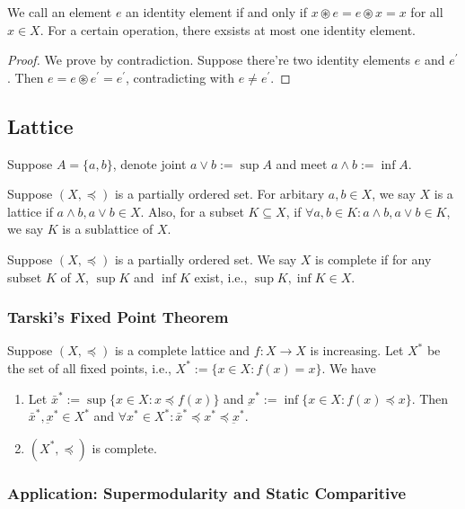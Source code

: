 \begin{proposition}
    We  call an element $e$ an identity element if and only if $x \circledast e = e \circledast x = x$ for all $x \in X$. For a certain operation, there exsists at most one identity element.    
\end{proposition}
\begin{proof}
    We prove by contradiction. Suppose there're two identity elements $e$ and $e^{\prime}$. Then $e =e \circledast e^{\prime} = e^{\prime}$, contradicting with $e \neq e^{\prime}$.
\end{proof}


\subsection{Lattice}
Suppose $A=\{a,b\}$, denote joint $a \lor b:= \sup A$ and meet $a \land b:= \inf A$.
\begin{definition}[Lattice]
    Suppose $(X,\preceq)$ is a partially ordered set. For arbitary $a,b\in X$, we say $X$ is a lattice if $a \land b, a\lor b \in X$. Also, for a subset $K\subseteq X$, if $\forall a, b \in K : a \land b, a\lor b \in K$, we say $K$ is a sublattice of $X$.
\end{definition}


\begin{definition}[Completeness]
    Suppose $(X,\preceq)$ is a partially ordered set. We say $X$ is complete if for any subset $K$ of $X$, $\sup K$ and $\inf K$ exist, i.e., $\sup K, \inf K \in X$.
\end{definition}

\subsubsection{Tarski's Fixed Point Theorem}
\begin{theorem}[Tarski]
    Suppose $(X,\preceq)$ is a complete lattice and $f: X\to X$ is increasing. Let $X^*$ be the set of all fixed points, i.e., $X^* := \{x\in X: f(x) = x\}$.
    We have
    \begin{enumerate}
        \item Let $\bar{x}^* := \sup\{x\in X: x\preceq f(x)\}$ and $\underbar{x}^* := \inf\{x\in X : f(x)\preceq x\}$. Then $\bar{x}^*, \underbar{x}^* \in X^*$ and $\forall x^* \in X^*: \bar{x}^*\preceq x^* \preceq \underbar{x}^* $.
        \item $(X^*,\preceq)$ is complete.
    \end{enumerate}
\end{theorem}

\subsubsection{Application: Supermodularity and Static Comparitive}